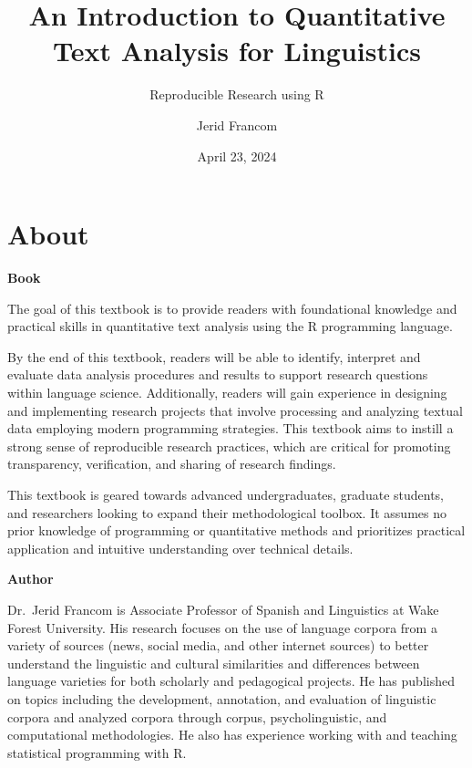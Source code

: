 \documentclass[
  letterpaper,
]{book}
\title{An Introduction to Quantitative Text Analysis for Linguistics}
\subtitle{Reproducible Research using R}
\author{Jerid Francom}
\date{April 23, 2024}
\renewcommand*\contentsname{Table of contents}
\newcommand\contentsname{Table of contents}
\theoremstyle{definition}
\theoremstyle{remark}
\begin{document}
\frontmatter
\maketitle



\renewcommand*\contentsname{Table of contents}
{
\setcounter{tocdepth}{2}
\tableofcontents
}
\mainmatter
{}

\chapter*{About}\label{about}


\textbf{Book}

The goal of this textbook is to provide readers with foundational
knowledge and practical skills in quantitative text analysis using the R
programming language.

By the end of this textbook, readers will be able to identify, interpret
and evaluate data analysis procedures and results to support research
questions within language science. Additionally, readers will gain
experience in designing and implementing research projects that involve
processing and analyzing textual data employing modern programming
strategies. This textbook aims to instill a strong sense of reproducible
research practices, which are critical for promoting transparency,
verification, and sharing of research findings.

This textbook is geared towards advanced undergraduates, graduate
students, and researchers looking to expand their methodological
toolbox. It assumes no prior knowledge of programming or quantitative
methods and prioritizes practical application and intuitive
understanding over technical details.

\textbf{Author}

Dr.~Jerid Francom is Associate Professor of Spanish and Linguistics at
Wake Forest University. His research focuses on the use of language
corpora from a variety of sources (news, social media, and other
internet sources) to better understand the linguistic and cultural
similarities and differences between language varieties for both
scholarly and pedagogical projects. He has published on topics including
the development, annotation, and evaluation of linguistic corpora and
analyzed corpora through corpus, psycholinguistic, and computational
methodologies. He also has experience working with and teaching
statistical programming with R.
\end{document}
